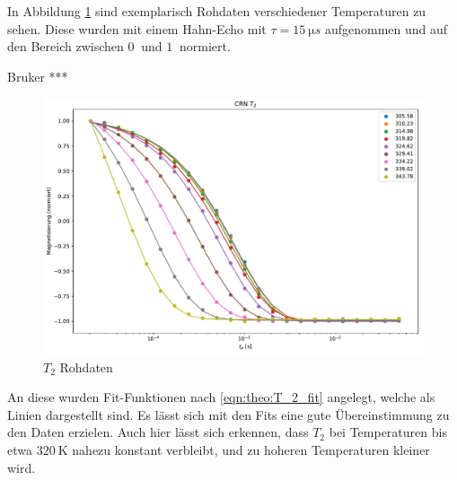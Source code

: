 In Abbildung \ref{fig:res:T_2_roh} sind exemplarisch Rohdaten verschiedener Temperaturen zu sehen. Diese wurden mit einem Hahn-Echo mit $\tau = \SI{15}{\micro s}$ aufgenommen und auf den Bereich zwischen $\SI{0}{}$ und $\SI{1}{}$ normiert.

Bruker *** 

\begin{figure}
	\begin{center}
		\includegraphics[width=\textwidth]{graphics/plots/T2/t2_roh.pdf}
	\end{center}
	\caption{$T_2$ Rohdaten} \label{fig:res:T_2_roh}
\end{figure}

An diese wurden Fit-Funktionen nach \eqref{eqn:theo:T_2_fit} angelegt, welche als Linien dargestellt sind. Es lässt sich mit den Fits eine gute Übereinstimmung zu den Daten erzielen. Auch hier lässt sich erkennen, dass $T_2$ bei Temperaturen bis etwa $\SI{320}{\kelvin}$ nahezu konstant verbleibt, und zu hoheren Temperaturen kleiner wird.

